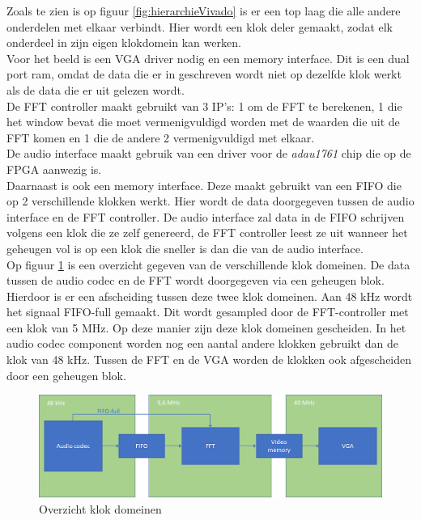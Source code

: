 \documentclass[a4paper,kul]{kulakarticle} %
\begin{document}
Zoals te zien is op figuur \ref{fig:hierarchieVivado} is er een top laag die alle andere onderdelen met elkaar verbindt. Hier wordt een klok deler gemaakt, zodat elk onderdeel in zijn eigen klokdomein kan werken. \\

Voor het beeld is een VGA driver nodig en een memory interface. Dit is een dual port ram, omdat de data die er in geschreven wordt niet op dezelfde klok werkt als de data die er uit gelezen wordt. \\

De FFT controller maakt gebruikt van 3 IP's: 1 om de FFT te berekenen, 1 die het window bevat die moet vermenigvuldigd worden met de waarden die uit de FFT komen en 1 die de andere 2 vermenigvuldigd met elkaar. \\

De audio interface maakt gebruik van een driver voor de \textit{adau1761} chip die op de FPGA aanwezig is.\\

Daarnaast is ook een memory interface. Deze maakt gebruikt van een FIFO die op 2 verschillende klokken werkt. Hier wordt de data doorgegeven tussen de audio interface en de FFT controller. De audio interface zal data in de FIFO schrijven volgens een klok die ze zelf genereerd, de FFT controller leest ze uit wanneer het geheugen vol is op een klok die sneller is dan die van de audio interface.\\

Op figuur \ref{fig:klok_domeinen} is een overzicht gegeven van de verschillende klok domeinen. De data tussen de audio codec en de FFT wordt doorgegeven via een geheugen blok. Hierdoor is er een afscheiding tussen deze twee klok domeinen. Aan 48 kHz wordt het signaal FIFO-full gemaakt. Dit wordt gesampled door de FFT-controller met een klok van 5 MHz. Op deze manier zijn deze klok domeinen gescheiden. In het audio codec component worden nog een aantal andere klokken gebruikt dan de klok van 48 kHz.
Tussen de FFT en de VGA worden de klokken ook afgescheiden door een geheugen blok.

\begin{figure}[H]
	\centering
	\includegraphics[width=0.7\linewidth]{overzicht_klok_domeinen.png}
	\caption{Overzicht klok domeinen}
	\label{fig:klok_domeinen}
\end{figure}
\end{document}
